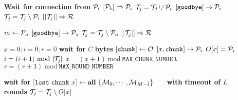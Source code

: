 \documentclass{article}
\begin{document}
\pagestyle{empty}

\newcommand{\send}{\Rightarrow}
\newcommand{\sendto}{\rightarrow}
\newcommand{\recv}{\Leftarrow}
\algrenewcommand{}

\begin{algorithmic}

  \State \textbf{Wait for connection from} ${\cal P}_i$
   $[{\cal P}_k] \send {\cal P}_i$
  \EndFor
  \State ${\cal T}_j={\cal T}_j \cup {\cal P}_i$
  \Else
  \State $[\mathtt{goodbye}] \sendto {\cal P}_i$
  \State ${\cal T}_j={\cal T}_j \setminus {\cal P}_i$
  \EndIf
  \State $[|{\cal T}_j|] \send {\cal R}$
  \EndWhile
  \EndProcedure

  \State $m \gets {\cal P}_o$
  \State $[\mathtt{goodbye}] \sendto {\cal P}_o$
  \State ${\cal T}_j={\cal T}_j \setminus {\cal P}_o$
  \EndIf
  \State $[|{\cal T}_j|] \send {\cal R}$
  \EndWhile
  \EndProcedure

  \State $x=0; i=0; r=0$
  \State \textbf{wait for} $C$ \textbf{bytes} $[\mathtt{chunk}] \gets {\cal O}$
  \State $[x,\mathtt{chunk}] \sendto {\cal P}_i$
  \State $O[x]={\cal P}_i$
  \State $i=(i+1)~\text{mod}~|{\cal T}_j|$
  \State $x=(x+1)~\text{mod}~\mathtt{MAX\_CHUNK\_NUMBER}$
  $r=(r+1)~\text{mod}~\mathtt{MAX\_ROUND\_NUMBER}$
  \EndIf
  \EndWhile
  \EndProcedure
  
  \State \textbf{wait for} $[\mathtt{lost~chunk}~x] \gets \textbf{all}~\{{\cal M}_0,\cdots, {\cal M}_{M-1}\}$
  \State~~~\textbf{with timeout of $L$ rounds}
  ${\cal T}_j = {\cal T}_j \setminus O[x]$
  \EndIf
  \EndWhile
  \EndProcedure
  
\end{algorithmic}
\end{document}
